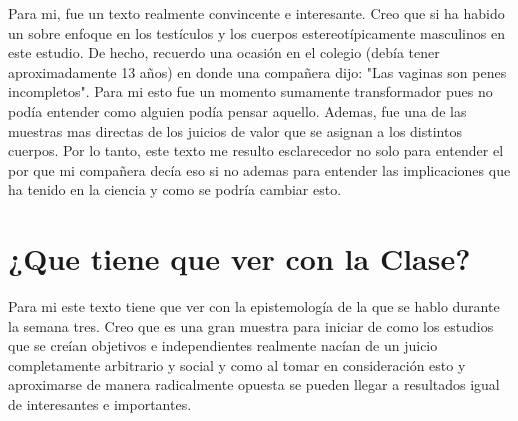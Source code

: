 \documentclass[12pt]{exam}
\begin{document}
Para mi, fue un texto realmente convincente e interesante. Creo que si ha habido un sobre enfoque en los testículos y los cuerpos estereotípicamente masculinos en este estudio. De hecho, recuerdo una ocasión en el colegio (debía tener aproximadamente 13 años) en donde una compañera dijo: "Las vaginas son penes incompletos". Para mi esto fue un momento sumamente transformador pues no podía entender como alguien podía pensar aquello. Ademas, fue una de las muestras mas directas de los juicios de valor que se asignan a los distintos cuerpos. Por lo tanto, este texto me resulto esclarecedor no solo para entender el por que mi compañera decía eso si no ademas para entender las implicaciones que ha tenido en la ciencia y como se podría cambiar esto.

\section*{¿Que tiene que ver con la Clase?}

Para mi este texto tiene que ver con la epistemología de la que se hablo durante la semana tres. Creo que es una gran muestra para iniciar de como los estudios que se creían objetivos e independientes realmente nacían de un juicio completamente arbitrario y social y como al tomar en consideración esto y aproximarse de manera radicalmente opuesta se pueden llegar a resultados igual de interesantes e importantes. 
\end{document}
